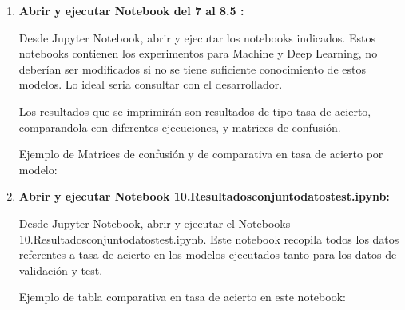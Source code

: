 \begin{enumerate}
\begin{enumerate}
 
    \item
    \textbf{Abrir y ejecutar Notebook del 7 al 8.5 :} 
    
    Desde Jupyter Notebook, abrir y ejecutar los notebooks indicados.
    Estos notebooks contienen los experimentos para Machine y Deep Learning, no deberían ser modificados si no se tiene suficiente conocimiento de estos modelos. Lo ideal seria consultar con el desarrollador.
    
    Los resultados que se imprimirán son resultados de tipo tasa de acierto, comparandola con diferentes ejecuciones, y matrices de confusión.
    
    Ejemplo de Matrices de confusión y de comparativa en tasa de acierto por modelo:
    
    
    
   \item
    \textbf{Abrir y ejecutar Notebook 10.Resultadosconjuntodatostest.ipynb:} 
    
    Desde Jupyter Notebook, abrir y ejecutar el Notebooks 10.Resultadosconjuntodatostest.ipynb.
    Este notebook recopila todos los datos referentes a tasa de acierto en los modelos ejecutados tanto para los datos de validación y test.
    
    Ejemplo de tabla comparativa en tasa de acierto en este notebook:
    
    
	\end{enumerate}  

\end{enumerate} 

